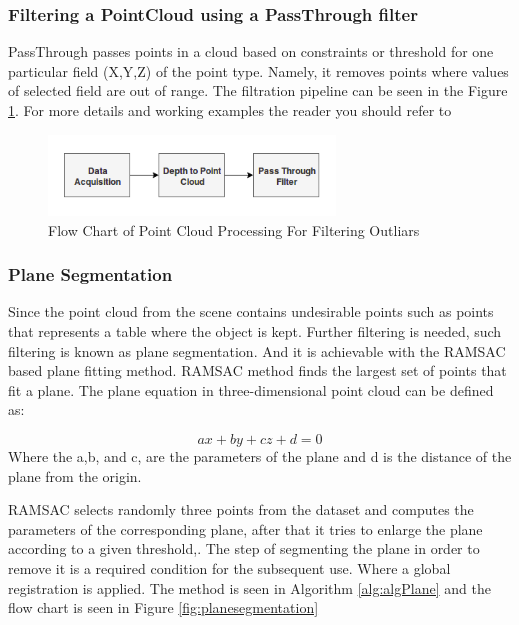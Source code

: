 \subsubsection{Filtering a PointCloud using a PassThrough filter}

PassThrough passes points in a cloud based on constraints or threshold for one particular field (X,Y,Z) of the point type. Namely, it removes points where values of selected field are out of range. The filtration pipeline can be seen in the Figure \ref{fig:passthrough}. For more details and working examples the reader you should refer to \cite{pcl}

\begin{figure}[!h]
\begin{center}
\includegraphics[width=3in]{diagrams/passthrough.png}
\caption{Flow Chart of Point Cloud Processing For Filtering Outliars}%
\label{fig:passthrough}
\end{center}
\end{figure}


\subsubsection{Plane Segmentation}

Since the point cloud from the scene contains undesirable points such as points that represents a table where the object is kept. Further filtering is needed, such filtering is known as plane segmentation. And it is achievable with the RAMSAC based plane fitting method. RAMSAC method finds the largest set of points that fit a plane. The plane equation in three-dimensional point cloud can be defined as:

\begin{equation}
    ax+by+cz+d=0
\end{equation}
Where the a,b, and c, are the parameters of the plane and d is the distance of the plane from the origin.

RAMSAC selects randomly three points from the dataset and computes the parameters of the corresponding plane, after that it tries to enlarge the plane according to a given threshold,\cite{algPlane}. The step of segmenting the plane in order to remove it is a required condition for the subsequent use. Where a global registration is applied.  The method is seen in Algorithm \ref{alg:algPlane} and the flow chart is seen in Figure \ref{fig:planesegmentation}  

